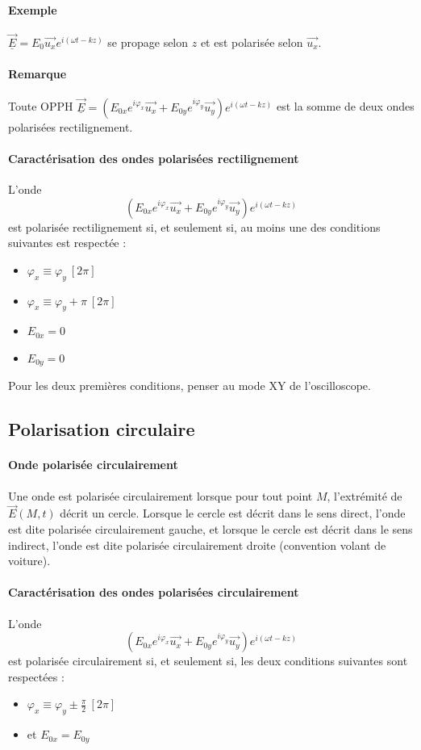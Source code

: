 \documentclass[french]{book}
\theoremstyle{plain}
\theoremstyle{definition}
\theoremstyle{remark}
\begin{document}
\paragraph{Exemple} $\overrightarrow{\underline{E}}=E_0\overrightarrow{u_x}e^{i(\omega t-kz)}$ se propage selon $z$ et est polarisée selon $\overrightarrow{u_x}$.
\paragraph{Remarque} Toute OPPH $\overrightarrow{\underline{E}}=(E_{0x}e^{i\varphi_x}\overrightarrow{u_x}+E_{0y}e^{i\varphi_y}\overrightarrow{u_y})e^{i(\omega t-kz)}$ est la somme de deux ondes polarisées rectilignement. 
\paragraph{Caractérisation des ondes polarisées rectilignement} L'onde $$(E_{0x}e^{i\varphi_x}\overrightarrow{u_x}+E_{0y}e^{i\varphi_y}\overrightarrow{u_y})e^{i(\omega t-kz)}$$ est polarisée rectilignement si, et seulement si, au moins une des conditions suivantes est respectée :
\begin{itemize}
	\item $\varphi_x \equiv \varphi_y \ [2\pi]$
	\item $\varphi_x \equiv \varphi_y +\pi\ [2\pi]$
	\item $E_{0x}=0$
	\item $E_{0y}=0$
\end{itemize}
Pour les deux premières conditions, penser au mode XY de l'oscilloscope.
\subsection{Polarisation circulaire}
\paragraph{Onde polarisée circulairement}
Une onde est polarisée circulairement lorsque pour tout point $M$, l'extrémité de $\overrightarrow{E}(M,t)$ décrit un cercle. Lorsque le cercle est décrit dans le sens direct, l'onde est dite polarisée circulairement gauche, et lorsque le cercle est décrit dans le sens indirect, l'onde est dite polarisée circulairement droite (convention volant de voiture).

\paragraph{Caractérisation des ondes polarisées circulairement} L'onde $$(E_{0x}e^{i\varphi_x}\overrightarrow{u_x}+E_{0y}e^{i\varphi_y}\overrightarrow{u_y})e^{i(\omega t-kz)}$$ est polarisée circulairement si, et seulement si, les deux conditions suivantes sont respectées :
\begin{itemize}
	\item $\varphi_x\equiv\varphi_y\pm\frac{\pi}{2} \ [2\pi]$
	\item et $E_{0x}=E_{0y}$
\end{itemize}
\end{document}
